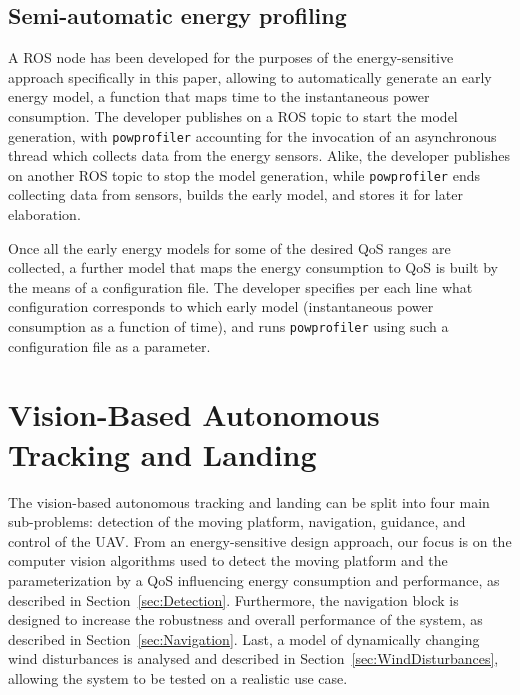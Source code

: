 \documentclass[conference]{IEEEtran}
\newcommand{\stt}[1]{{\small\tt #1}} %
\newcommand{\powprof}{\stt{powprofiler}}
\newcommand{\adam}[2][]{\todo[color=orange!20, #1]{ADAM: #2}}
\begin{document}

\subsection{Semi-automatic energy profiling}


%
A ROS node has been developed for the purposes of the energy-sensitive
approach specifically in this paper, allowing to automatically
generate an early energy model, a function that maps time to the
instantaneous power consumption. The developer publishes on a ROS
topic to start the model generation, with \powprof{} accounting for
the invocation of an asynchronous thread which collects data from the
energy sensors. Alike, the developer publishes on another ROS topic to
stop the model generation, while \powprof{} ends collecting data from
sensors, builds the early model, and stores it for later elaboration.

Once all the early energy models for some of the desired QoS ranges
are collected, a further model that maps the energy consumption to QoS
is built by the means of a configuration file. The developer specifies
per each line what configuration corresponds to which early model
(instantaneous power consumption as a function of time), and runs
\powprof{} using such a configuration file as a parameter.
%

\section{Vision-Based Autonomous Tracking and Landing}
\label{sec:landing}

The vision-based autonomous tracking and landing can be split into
four main sub-problems: detection of the moving platform, navigation,
guidance, and control of the UAV. From an energy-sensitive design
approach, our focus is on the computer vision algorithms used to
detect the moving platform and the parameterization by a QoS
influencing energy consumption and performance, as described in
Section~\ref{sec:Detection}. Furthermore, the navigation block is
designed to increase the robustness and overall performance of the
system, as described in Section~\ref{sec:Navigation}. Last, a model of
dynamically changing wind disturbances is analysed and described in
Section~\ref{sec:WindDisturbances}, allowing the system to be tested
on a realistic use case.
\end{document}
